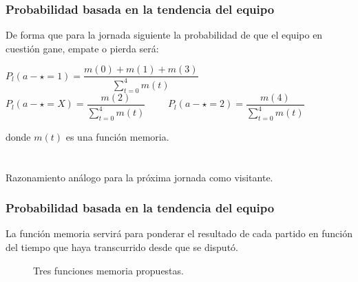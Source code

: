 \documentclass{beamer}
\begin{document}
	\begin{frame}
		\frametitle{Probabilidad basada en la tendencia del equipo}
		De forma que para la jornada siguiente la probabilidad de que el equipo en cuestión gane, empate o pierda será:\\
		
		\begin{center}
			$P_{l}(a - \star=1)=\dfrac{m(0)+m(1)+m(3)}{\sum_{t=0}^{4}m(t)}$\\
			$P_{l}(a - \star=X)=\dfrac{m(2)}{\sum_{t=0}^{4}m(t)}$ \ \ \ \
			$P_{l}(a - \star=2)=\dfrac{m(4)}{\sum_{t=0}^{4}m(t)}$
		\end{center}
		donde $m(t)$ es una función memoria.\\
		\ \\ \ \\
		Razonamiento análogo para la próxima jornada como visitante.
	\end{frame}	
	
	\begin{frame}
		\frametitle{Probabilidad basada en la tendencia del equipo}
		La función memoria servirá para ponderar el resultado de cada partido en función del tiempo que haya transcurrido desde que se disputó.
		\begin{figure}
			\caption{Tres funciones memoria propuestas.}
		\end{figure} 
	\end{frame}		
	
\end{document}
